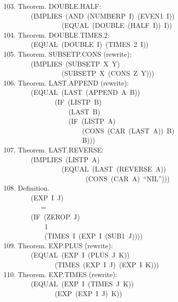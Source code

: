 \documentclass[10pt]{book}
\newenvironment{pubasis}{\begin{flushleft}}{\end{flushleft}}
\begin{document}
\begin{pubasis}
103.    Theorem.  DOUBLE.HALF:\\
~~~~~~~~(IMPLIES~(AND~(NUMBERP~I)~(EVEN1~I))\\
~~~~~~~~~~~~~~~~~(EQUAL~(DOUBLE~(HALF~I))~I))\\

104.    Theorem.  DOUBLE.TIMES.2:\\
~~~~~~~~(EQUAL~(DOUBLE~I)~(TIMES~2~I))\\

105.    Theorem.  SUBSETP.CONS (rewrite):\\
~~~~~~~~(IMPLIES~(SUBSETP~X~Y)\\
~~~~~~~~~~~~~~~~~(SUBSETP~X~(CONS~Z~Y)))\\

106.    Theorem.  LAST.APPEND (rewrite):\\
~~~~~~~~(EQUAL~(LAST~(APPEND~A~B))\\
~~~~~~~~~~~~~~~(IF~(LISTP~B)\\
~~~~~~~~~~~~~~~~~~~(LAST~B)\\
~~~~~~~~~~~~~~~~~~~(IF~(LISTP~A)\\
~~~~~~~~~~~~~~~~~~~~~~~(CONS~(CAR~(LAST~A))~B)\\
~~~~~~~~~~~~~~~~~~~~~~~B)))\\

107.    Theorem.  LAST.REVERSE:\\
~~~~~~~~(IMPLIES~(LISTP~A)\\
~~~~~~~~~~~~~~~~~(EQUAL~(LAST~(REVERSE~A))\\
~~~~~~~~~~~~~~~~~~~~~~~~(CONS~(CAR~A)~``NIL'')))\\

108.    Definition.\\
~~~~~~~~(EXP~I~J)\\
~~~~~~~~~~~=\\
~~~~~~~~(IF~(ZEROP~J)\\
~~~~~~~~~~~~1\\
~~~~~~~~~~~~(TIMES~I~(EXP~I~(SUB1~J))))\\

109.    Theorem.  EXP.PLUS (rewrite):\\
~~~~~~~~(EQUAL~(EXP~I~(PLUS~J~K))\\
~~~~~~~~~~~~~~~(TIMES~(EXP~I~J)~(EXP~I~K)))\\

110.    Theorem.  EXP.TIMES (rewrite):\\
~~~~~~~~(EQUAL~(EXP~I~(TIMES~J~K))\\
~~~~~~~~~~~~~~~(EXP~(EXP~I~J)~K))\\


\end{pubasis}
\end{document}
